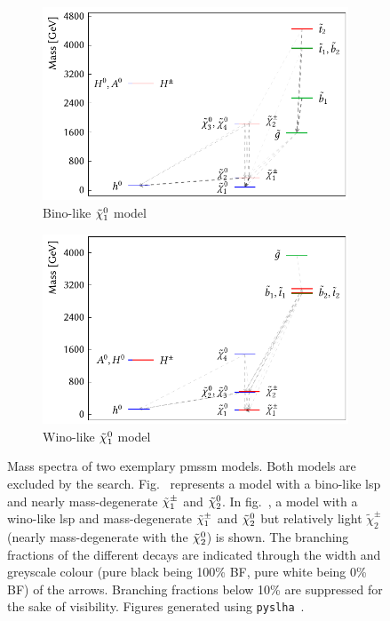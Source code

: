 \begin{figure}
	\centering
	\begin{subfigure}[b]{0.49\linewidth}
		\centering\includegraphics[width=\textwidth]{thesis_plot_9127}
		\caption{Bino-like $\tilde{\chi}_1^0$ model\label{fig:slha_1}}
	\end{subfigure}\hfill
	\begin{subfigure}[b]{0.49\linewidth}
		\centering\includegraphics[width=\textwidth]{thesis_plot_1655}
		\caption{Wino-like $\tilde{\chi}_1^0$ model\label{fig:slha_2}}
	\end{subfigure}\hfill
	\caption{Mass spectra of two exemplary \gls{pmssm} models. Both models are excluded by the \onelepton search. Fig.~ represents a model with a bino-like \gls{lsp} and nearly mass-degenerate $\tilde{\chi}_1^\pm$ and $\tilde{\chi}_2^0$. In fig.~, a model with a wino-like \gls{lsp} and mass-degenerate $\tilde{\chi}_1^\pm$ and $\tilde{\chi}_2^0$ but relatively light $\tilde{\chi}_2^\pm$ (nearly mass-degenerate with the $\tilde{\chi}_2^0$) is shown. The branching fractions of the different decays are indicated through the width and greyscale colour (pure black being 100\% BF, pure white being 0\% BF) of the arrows. Branching fractions below 10\% are suppressed for the sake of visibility. Figures generated using \texttt{pyslha}~\cite{pyslha:2013jua}.}
	\label{fig:slha}
\end{figure}

